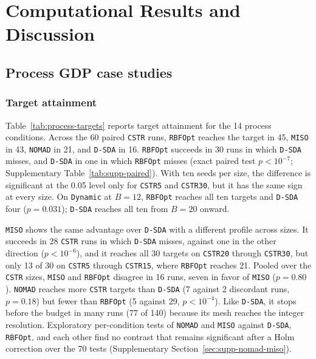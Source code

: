 \documentclass{article}
\begin{document}
\section{Computational Results and Discussion}
\label{sec:results}

\subsection{Process GDP case studies}
\label{sec:process-results}

\subsubsection{Target attainment}
Table~\ref{tab:process-targets} reports target attainment for the 14 process conditions.
Across the 60 paired \texttt{CSTR} runs, \texttt{RBFOpt} reaches the target in 45, \texttt{MISO} in 43, \texttt{NOMAD} in 21, and \texttt{D-SDA} in 16.
\texttt{RBFOpt} succeeds in 30 runs in which \texttt{D-SDA} misses, and \texttt{D-SDA} in one in which \texttt{RBFOpt} misses (exact paired test \(p<10^{-7}\); Supplementary Table~\ref{tab:supp-paired}).
With ten seeds per size, the difference is significant at the 0.05 level only for \texttt{CSTR5} and \texttt{CSTR30}, but it has the same sign at every size.
On \texttt{Dynamic} at \(B=12\), \texttt{RBFOpt} reaches all ten targets and \texttt{D-SDA} four (\(p=0.031\)); \texttt{D-SDA} reaches all ten from \(B=20\) onward.

\texttt{MISO} shows the same advantage over \texttt{D-SDA} with a different profile across sizes.
It succeeds in 28 \texttt{CSTR} runs in which \texttt{D-SDA} misses, against one in the other direction (\(p<10^{-6}\)), and it reaches all 30 targets on \texttt{CSTR20} through \texttt{CSTR30}, but only 13 of 30 on \texttt{CSTR5} through \texttt{CSTR15}, where \texttt{RBFOpt} reaches 21.
Pooled over the \texttt{CSTR} sizes, \texttt{MISO} and \texttt{RBFOpt} disagree in 16 runs, seven in favor of \texttt{MISO} (\(p=0.80\)).
\texttt{NOMAD} reaches more \texttt{CSTR} targets than \texttt{D-SDA} (7 against 2 discordant runs, \(p=0.18\)) but fewer than \texttt{RBFOpt} (5 against 29, \(p<10^{-4}\)).
Like \texttt{D-SDA}, it stops before the budget in many runs (77 of 140) because its mesh reaches the integer resolution.
Exploratory per-condition tests of \texttt{NOMAD} and \texttt{MISO} against \texttt{D-SDA}, \texttt{RBFOpt}, and each other find no contrast that remains significant after a Holm correction over the 70 tests (Supplementary Section~\ref{sec:supp-nomad-miso}).
\end{document}
